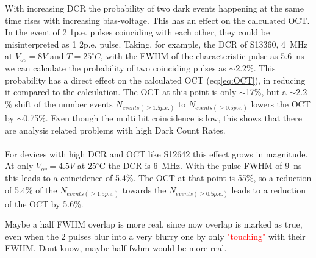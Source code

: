 \documentclass[12pt,article,type=msc,colorback,accentcolor=tud9c]{tudthesis}
\begin{document}
With increasing DCR the probability of two dark events happening at the same time rises with increasing bias-voltage. This has an effect on the calculated OCT. In the event of 2 1p.e. pulses coinciding with each other, they could be misinterpreted as 1 2p.e. pulse. Taking, for example, the DCR of S13360, 4~MHz at $V_{ov}=8V$ and $T=25^\circ C$, with the FWHM of the characteristic pulse as 5.6~ns we can calculate the probability of two coinciding pulses as $\sim$2.2$\%$. This probability has a direct effect on the calculated OCT (eq:\ref{eq:OCT}), in reducing it compared to the calculation. The OCT at this point is only $\sim$17$\%$, but a $\sim$2.2$\%$ shift of the number events $N_{events(\geq 1.5p.e.)}$ to $N_{events(\geq 0.5p.e.)}$ lowers the OCT by $\sim$0.75$\%$. Even though the multi hit coincidence is low, this shows that there are analysis related problems with high Dark Count Rates.\\\\

For devices with high DCR and OCT like S12642 this effect grows in magnitude. At only $V_{ov}=4.5V$ at 25$^\circ$C the DCR is 6~MHz. With the pulse FWHM of 9~ns this leads to a coincidence of 5.4$\%$. The OCT at that point is 55$\%$, so a reduction of 5.4$\%$ of the $N_{events(\geq 1.5p.e.)}$ towards the $N_{events(\geq 0.5p.e.)}$ leads to a reduction of the OCT by 5.6$\%$.

Maybe a half FWHM overlap is more real, since now overlap is marked as true, even when the 2 pulses blur into a very blurry one by only \textcolor{red}{"touching"} with their FWHM. Dont know, maybe half fwhm would be more real.




\clearpage
\newpage



\end{document}
